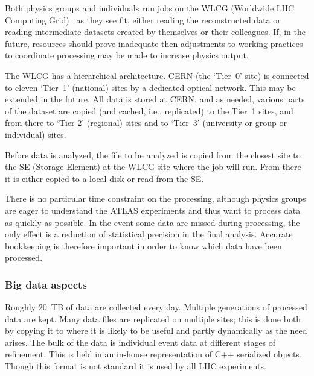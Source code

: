 
Both physics groups and individuals run jobs on the WLCG (Worldwide LHC Computing Grid)~\cite{lhcb} as they see fit, either reading the reconstructed data or reading intermediate datasets created by themselves or their colleagues. If, in the future, resources should prove inadequate then adjustments to working practices to coordinate processing may be made to increase physics output.

The WLCG has a hierarchical architecture. CERN (the `Tier~0' site) is connected to eleven `Tier~1' (national) sites by a dedicated optical network. This may be extended in the future.  All data is stored at CERN, and as needed, various parts of the dataset are copied (and cached, i.e., replicated) to the Tier~1 sites, and from there to `Tier 2' (regional) sites and to `Tier~3' (university or group or individual) sites.

Before data is analyzed, the file to be analyzed is copied from the closest site to the SE (Storage Element) at the WLCG site where the job will run. From there it is either copied to a local disk or read from the SE.

There is no particular time constraint on the processing, although physics groups are eager to understand the ATLAS experiments and thus want to process data as quickly as possible.  In the event some data are missed during processing, the only effect is a reduction of statistical precision in the final analysis. Accurate bookkeeping is therefore important in order to know which data have been processed.

 \subsubsection*{Big data aspects}


Roughly 20~TB of data are collected every day. Multiple generations of processed data are kept. Many data files are replicated on multiple sites; this is done both by copying it to where it is likely to be useful and partly dynamically as the need arises.  The bulk of the data is individual event data at different stages of refinement. This is held in an in-house representation of C++ serialized objects. Though this format is not standard it is used by all LHC experiments.


